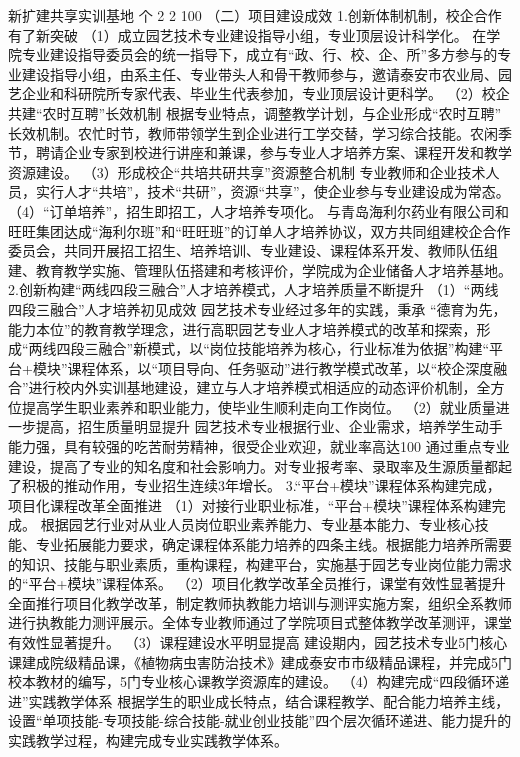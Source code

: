 新扩建共享实训基地
个
2
2
100%
（二）项目建设成效
1.创新体制机制，校企合作有了新突破
（1）成立园艺技术专业建设指导小组，专业顶层设计科学化。
在学院专业建设指导委员会的统一指导下，成立有“政、行、校、企、所”多方参与的专业建设指导小组，由系主任、专业带头人和骨干教师参与，邀请泰安市农业局、园艺企业和科研院所专家代表、毕业生代表参加，专业顶层设计更科学。
（2）校企共建“农时互聘”长效机制
根据专业特点，调整教学计划，与企业形成“农时互聘” 长效机制。农忙时节，教师带领学生到企业进行工学交替，学习综合技能。农闲季节，聘请企业专家到校进行讲座和兼课，参与专业人才培养方案、课程开发和教学资源建设。
（3）形成校企“共培共研共享”资源整合机制
专业教师和企业技术人员，实行人才“共培”，技术“共研”，资源“共享”，使企业参与专业建设成为常态。
（4）“订单培养”，招生即招工，人才培养专项化。
与青岛海利尔药业有限公司和旺旺集团达成“海利尔班”和“旺旺班”的订单人才培养协议，双方共同组建校企合作委员会，共同开展招工招生、培养培训、专业建设、课程体系开发、教师队伍组建、教育教学实施、管理队伍搭建和考核评价，学院成为企业储备人才培养基地。
2.创新构建“两线四段三融合”人才培养模式，人才培养质量不断提升
（1）“两线四段三融合”人才培养初见成效
园艺技术专业经过多年的实践，秉承 “德育为先，能力本位”的教育教学理念，进行高职园艺专业人才培养模式的改革和探索，形成“两线四段三融合”新模式，以“岗位技能培养为核心，行业标准为依据”构建“平台+模块”课程体系，以“项目导向、任务驱动”进行教学模式改革，以“校企深度融合”进行校内外实训基地建设，建立与人才培养模式相适应的动态评价机制，全方位提高学生职业素养和职业能力，使毕业生顺利走向工作岗位。
（2）就业质量进一步提高，招生质量明显提升
园艺技术专业根据行业、企业需求，培养学生动手能力强，具有较强的吃苦耐劳精神，很受企业欢迎，就业率高达100%
通过重点专业建设，提高了专业的知名度和社会影响力。对专业报考率、录取率及生源质量都起了积极的推动作用，专业招生连续3年增长。
3.“平台+模块”课程体系构建完成，项目化课程改革全面推进
（1）对接行业职业标准，“平台+模块”课程体系构建完成。
根据园艺行业对从业人员岗位职业素养能力、专业基本能力、专业核心技能、专业拓展能力要求，确定课程体系能力培养的四条主线。根据能力培养所需要的知识、技能与职业素质，重构课程，构建平台，实施基于园艺专业岗位能力需求的“平台+模块”课程体系。
（2）项目化教学改革全员推行，课堂有效性显著提升
全面推行项目化教学改革，制定教师执教能力培训与测评实施方案，组织全系教师进行执教能力测评展示。全体专业教师通过了学院项目式整体教学改革测评，课堂有效性显著提升。
（3）课程建设水平明显提高
建设期内，园艺技术专业5门核心课建成院级精品课，《植物病虫害防治技术》建成泰安市市级精品课程，并完成5门校本教材的编写，5门专业核心课教学资源库的建设。
（4）构建完成“四段循环递进”实践教学体系
根据学生的职业成长特点，结合课程教学、配合能力培养主线，设置“单项技能-专项技能-综合技能-就业创业技能”四个层次循环递进、能力提升的实践教学过程，构建完成专业实践教学体系。
